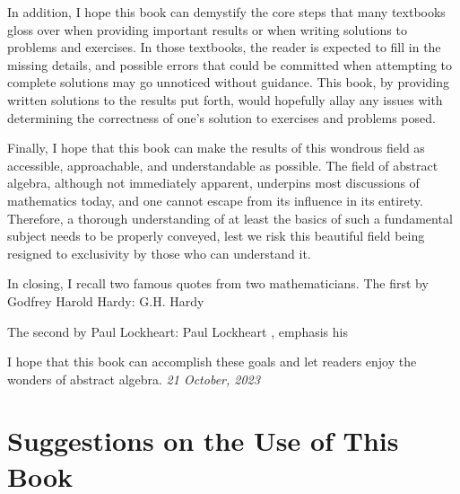 In addition, I hope this book can demystify the core steps that many textbooks gloss over when providing important results or when writing solutions to problems and exercises. In those textbooks, the reader is expected to fill in the missing details, and possible errors that could be committed when attempting to complete solutions may go unnoticed without guidance. This book, by providing written solutions to the results put forth, would hopefully allay any issues with determining the correctness of one's solution to exercises and problems posed.

Finally, I hope that this book can make the results of this wondrous field as accessible, approachable, and understandable as possible. The field of abstract algebra, although not immediately apparent, underpins most discussions of mathematics today, and one cannot escape from its influence in its entirety. Therefore, a thorough understanding of at least the basics of such a fundamental subject needs to be properly conveyed, lest we risk this beautiful field being resigned to exclusivity by those who can understand it.

\newpage

In closing, I recall two famous quotes from two mathematicians. The first by Godfrey Harold Hardy:
    {G.H. Hardy}
    {\cite[p.~43]{hardy_snow_1969}}

The second by Paul Lockheart:
    {Paul Lockheart}
    {\cite[p.~8]{lockheart_2002}, emphasis his}

I hope that this book can accomplish these goals and let readers enjoy the wonders of abstract algebra.
\hfill{\textit{21 October, 2023}}

\chapter{Suggestions on the Use of This Book}

